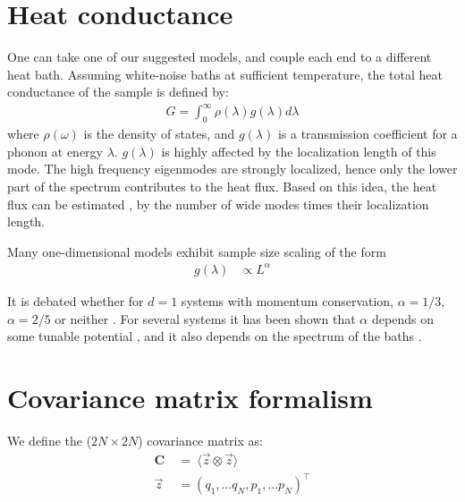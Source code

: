 \section{Heat conductance}\label{sec:heat}

One can take one of our suggested models, and couple each end to a different heat bath.
Assuming white-noise baths at sufficient temperature, the total heat conductance of the sample is defined by:
\begin{align}
G = \int_0^\infty \rho(\lambda) g(\lambda) d\lambda
\end{align}
where $\rho(\omega)$ is the density of states, and $g(\lambda)$ is 
a transmission coefficient for a phonon at energy $\lambda$.
$g(\lambda)$ is highly affected by the localization length of this mode\cite{tong_wave_1999}.
The high frequency eigenmodes are strongly localized, hence only the
lower part of the spectrum contributes to the heat flux. Based on this idea,
the heat flux can be estimated \cite{lepri_thermal_2001,lepri_thermal_2003,bodyfelt_unpub},
by the number of wide modes times their localization length.

 
Many one-dimensional models 
\cite{narayan_anomalous_2002,dhar_heat_2001,lepri_anomalous_1998,savin_heat_2002} 
exhibit sample size scaling of the form
%
\begin{align}
g(\lambda)    &\propto L^\alpha
\end{align}

It is debated whether for $d=1$ systems
with momentum conservation,  $\alpha=1/3$,$\alpha=2/5$ or neither
\cite{narayan_anomalous_2002,delfini_comment_2008,dhar_dhar_2008,wang_power-law_2011}.
For several systems it has been shown that $\alpha$ depends on some tunable potential \cite{tong_wave_1999},
and it also depends on the spectrum of the baths \cite{dhar_heat_2001}.




\section{Covariance matrix formalism}

We define the ($2N\times 2N$) covariance matrix as:
\begin{align}
\mathbf{C} \ &=\ \langle \vec{z}\otimes \vec{z}\rangle \\
\vec{z} &= (q_1,\ldots q_N, p_1,\ldots p_N)^\intercal
\end{align}


